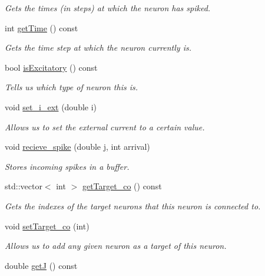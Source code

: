\begin{DoxyCompactItemize}
\begin{DoxyCompactList}\small\item\em Gets the times (in steps) at which the neuron has spiked. \end{DoxyCompactList}\item 
\hypertarget{classNeuron_a9e46269a0c66fc55f2db3fe06784dc02}{int \hyperlink{classNeuron_a9e46269a0c66fc55f2db3fe06784dc02}{get\-Time} () const }\label{classNeuron_a9e46269a0c66fc55f2db3fe06784dc02}

\begin{DoxyCompactList}\small\item\em Gets the time step at which the neuron currently is. \end{DoxyCompactList}\item 
bool \hyperlink{classNeuron_a65f5868f9a2ddc2414a5880f28b76d4c}{is\-Excitatory} () const 
\begin{DoxyCompactList}\small\item\em Tells us which type of neuron this is. \end{DoxyCompactList}\item 
void \hyperlink{classNeuron_a867d761515ce1a3b3e9ad9ace9c8acd4}{set\-\_\-i\-\_\-ext} (double i)
\begin{DoxyCompactList}\small\item\em Allows us to set the external current to a certain value. \end{DoxyCompactList}\item 
void \hyperlink{classNeuron_a6344345764786431d594d8d37a0ff62b}{recieve\-\_\-spike} (double j, int arrival)
\begin{DoxyCompactList}\small\item\em Stores incoming spikes in a buffer. \end{DoxyCompactList}\item 
\hypertarget{classNeuron_aa7baec9134a8213651399b7cdf35e753}{std\-::vector$<$ int $>$ \hyperlink{classNeuron_aa7baec9134a8213651399b7cdf35e753}{get\-Target\-\_\-co} () const }\label{classNeuron_aa7baec9134a8213651399b7cdf35e753}

\begin{DoxyCompactList}\small\item\em Gets the indexes of the target neurons that this neuron is connected to. \end{DoxyCompactList}\item 
void \hyperlink{classNeuron_af2433ece1d53eda213c25016479070cf}{set\-Target\-\_\-co} (int)
\begin{DoxyCompactList}\small\item\em Allows us to add any given neuron as a target of this neuron. \end{DoxyCompactList}\item 
\hypertarget{classNeuron_a320ab48e220523371b266385c650e31f}{double \hyperlink{classNeuron_a320ab48e220523371b266385c650e31f}{get\-J} () const }\label{classNeuron_a320ab48e220523371b266385c650e31f}


\end{DoxyCompactItemize}
